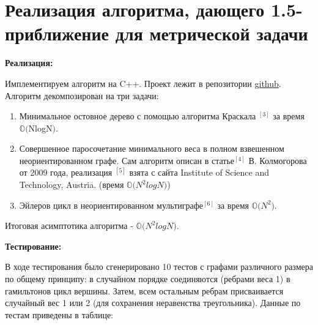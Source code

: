 \documentclass[14pt]{article}
\begin{document}
	
	
	\section{Реализация алгоритма, дающего 1.5-приближение для метрической задачи}
	
	\begin{center}
		\textbf{\large Реализация:}
	\end{center}
	
	Имплементируем алгоритм на C++. Проект лежит в репозитории \href{https://github.com/JerryCh0/complexity/tree/master/Christofides/Christofides}{github}.
	Алгоритм декомпозирован на три задачи:
	\begin{enumerate}
		\item Минимальное остовное дерево с помощью алгоритма Краскала \hyperref[Kruskal]{$^{[3]}$} за время $\mathbb{O(}$NlogN$)$. 
		\item Совершенное паросочетание минимального веса в полном взвешенном неориентированном графе. Сам алгоритм описан в статье\hyperref[kolm]{$^{[4]}$} В. Колмогорова от 2009 года, реализация \hyperref[realisation]{$^{[5]}$} взята с сайта Institute of Science and Technology, Austria. (время $\mathbb{O(}N^2logN)$)
		\item Эйлеров цикл в неориентированном мультиграфе\hyperref[euler]{$^{[6]}$} за время $\mathbb{O(}N^2)$.
	\end{enumerate}
	
	Итоговая асимптотика алгоритма - $\mathbb{O(}N^2logN)$.
	
	\begin{center}
		\textbf{\large Тестирование:}
	\end{center} 
	
	В ходе тестирования было сгенерировано 10 тестов с графами различного размера по общему принципу: в случайном порядке соединяются (ребрами веса 1) в гамильтонов цикл вершины. Затем, всем остальным ребрам присваивается случайный вес 1 или 2 (для сохранения неравенства треугольника). Данные по тестам приведены в таблице:
	
	$                  $
	
\end{document}
